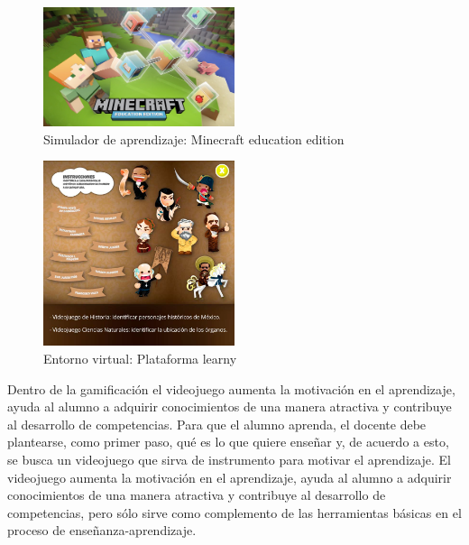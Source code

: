 	\begin{figure}
		\centering
	\caption{Simulador de aprendizaje: Minecraft education edition}
		\label{fig:mine}
		\includegraphics[width=0.5\textwidth]{03MarcoTeorico/imageR/minecraft.jpg}
\end{figure}
	\begin{figure}
	\centering
		\caption{Entorno virtual: Plataforma learny}
		\label{fig:lea}
		\includegraphics[width=0.5\textwidth]{03MarcoTeorico/imageR/learny.jpg}
\end{figure}

Dentro de la gamificación el videojuego aumenta la motivación en el aprendizaje, ayuda al alumno a adquirir conocimientos de una manera atractiva y contribuye al desarrollo de competencias. Para que el alumno aprenda, el docente debe plantearse, como primer paso, qué es lo que quiere enseñar y, de acuerdo a esto, se busca un videojuego que sirva de instrumento para motivar el aprendizaje. El videojuego aumenta la motivación en el aprendizaje, ayuda al alumno a adquirir conocimientos de una manera atractiva y contribuye al desarrollo de competencias, pero sólo sirve como complemento de las herramientas básicas en el proceso de enseñanza-aprendizaje.
\\[1pt]
